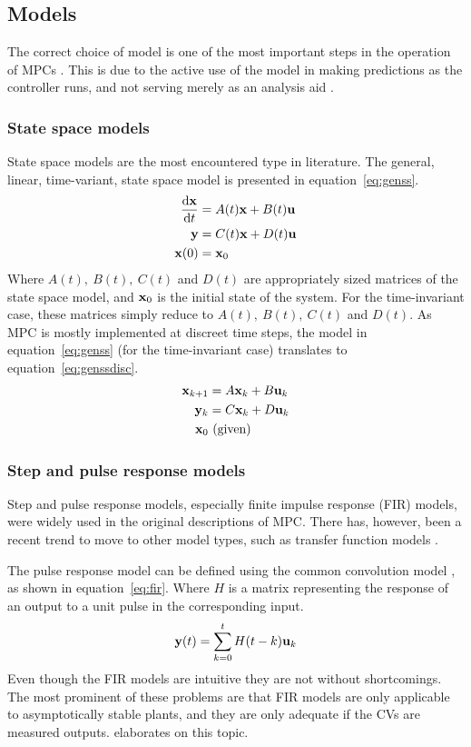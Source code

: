 \subsection{Models}
The correct choice of model is one of the most important steps in the operation of MPCs \citep[17]{rossiter}.
This is due to the active use of the model in making predictions as the controller runs, and not serving merely as an analysis aid \citep[37]{maciejowskimpc}.

\subsubsection{State space models}
State space models are the most encountered type in literature.
The general, linear, time-variant, state space model is presented in equation~\ref{eq:genss}.
\begin{align}
  \label{eq:genss}
  \frac{\mathrm{d}{\bf {x}}}{\mathrm{d}t} &= A(t){\bf {x}} + B(t){\bf {u}} \notag \\
  {\bf {y}} &= C(t){\bf {x}} + D(t){\bf {u}} \\
  {\bf {x}}(0) &= {\bf {x}}_0 \notag
\end{align}
Where $A(t),~B(t),~C(t)$ and $D(t)$ are appropriately sized matrices of the state space model, and ${\bf {x}}_0$ is the initial state of the system.
For the time-invariant case, these matrices simply reduce to $A(t),~B(t),~C(t)$ and $D(t)$. 
As MPC is mostly implemented at discreet time steps, the model in equation~\ref{eq:genss} (for the time-invariant case) translates to equation~\ref{eq:genssdisc}.
\begin{align}
  \label{eq:genssdisc}
  {\bf {x}}_{k+1} &= A{\bf {x}}_k + B{\bf {u}}_k \notag \\
  {\bf {y}}_k &= C{\bf {x}}_k + D{\bf {u}}_k \\
  {\bf {x}}_0 &~ \text{(given)} \notag
\end{align}

\subsubsection{Step and pulse response models}
Step and pulse response models, especially finite impulse response (FIR) models, were widely used in the original descriptions of MPC.
There has, however, been a recent trend to move to other model types, such as transfer function models .

The pulse response model can be defined using the common convolution model \citep[284]{luyben}, as shown in equation~\ref{eq:fir}.
Where $H$ is a matrix representing the response of an output to a unit pulse in the corresponding input.
\begin{equation}
  \label{eq:fir}
  {\bf {y}}(t) = \sum^t_{k=0}H(t-k){\bf {u}}_k
\end{equation} 
Even though the FIR models are intuitive they are not without shortcomings.
The most prominent of these problems are that FIR models are only applicable to asymptotically stable plants, and they are only adequate if the CVs are measured outputs.
\citet[109]{maciejowskimpc} elaborates on this topic.

